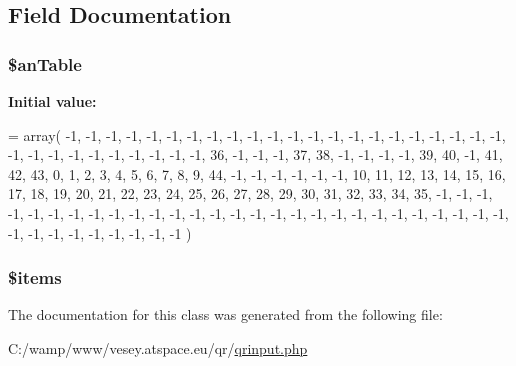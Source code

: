 \subsection{Field Documentation}
\hypertarget{class_q_rinput_ab60a6875b03625230e309bc73343f153}{
\subsubsection[{\$an\-Table}]{\setlength{\rightskip}{0pt plus 5cm}\$an\-Table\hspace{0.3cm}{\ttfamily [static]}}}\label{class_q_rinput_ab60a6875b03625230e309bc73343f153}
{\bfseries Initial value\-:}
\begin{DoxyCode}
= array(
            -1, -1, -1, -1, -1, -1, -1, -1, -1, -1, -1, -1, -1, -1, -1, -1,
            -1, -1, -1, -1, -1, -1, -1, -1, -1, -1, -1, -1, -1, -1, -1, -1,
            36, -1, -1, -1, 37, 38, -1, -1, -1, -1, 39, 40, -1, 41, 42, 43,
             0,  1,  2,  3,  4,  5,  6,  7,  8,  9, 44, -1, -1, -1, -1, -1,
            -1, 10, 11, 12, 13, 14, 15, 16, 17, 18, 19, 20, 21, 22, 23, 24,
            25, 26, 27, 28, 29, 30, 31, 32, 33, 34, 35, -1, -1, -1, -1, -1,
            -1, -1, -1, -1, -1, -1, -1, -1, -1, -1, -1, -1, -1, -1, -1, -1,
            -1, -1, -1, -1, -1, -1, -1, -1, -1, -1, -1, -1, -1, -1, -1, -1
        )
\end{DoxyCode}
\hypertarget{class_q_rinput_a737abdef83dabb219182c1e88887c6c3}{
\subsubsection[{\$items}]{\setlength{\rightskip}{0pt plus 5cm}\$items}}\label{class_q_rinput_a737abdef83dabb219182c1e88887c6c3}


The documentation for this class was generated from the following file\-:\begin{DoxyCompactItemize}
\item 
C\-:/wamp/www/vesey.\-atspace.\-eu/qr/\hyperlink{qrinput_8php}{qrinput.\-php}\end{DoxyCompactItemize}
